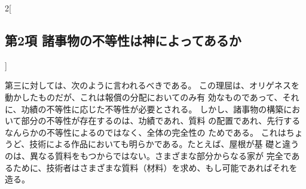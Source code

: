 \documentclass[paper=a4paper,fontsize=10pt,jafontsize=9pt,titlepage]{jlreq}
\begin{document}
\begin{paracol}{2}[\subsection{第2項 諸事物の不等性は神によってあるか}]
\switchcolumn


第三に対しては、次のように言われるべきである。
この理屈は、オリゲネスを動かしたものだが、これは報償の分配においてのみ有
 効なものであって、それに、功績の不等性に応じた不等性が必要とされる。
しかし、諸事物の構築において部分の不等性が存在するのは、功績であれ、質料
 の配置であれ、先行するなんらかの不等性によるのではなく、全体の完全性の
 ためである。
これはちょうど、技術による作品においても明らかである。たとえば、屋根が基
 礎と違うのは、異なる質料をもつからではない。さまざまな部分からなる家が
 完全であるために、技術者はさまざまな質料（材料）を求め、もし可能であればそれを
 造る。


\switchcolumn*



\end{paracol}
\newpage
{}
\end{document}
